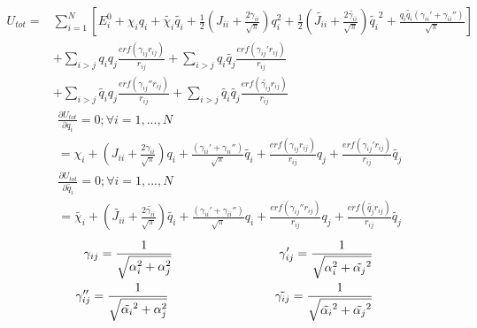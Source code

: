 \documentclass{letter}
\begin{document}
	\begin{equation}
	\begin{split}
		U_{tot}  = &\sum_{i=1}^{N} [E_i^0 + \chi_i q_i + \tilde{\chi_i}\tilde{q_i }+ \frac{1}{2}(J_{ii}+\frac{2\gamma_{ii}}{\sqrt{\pi}})q_i^2 + \frac{1}{2}(\tilde{J_{ii}}+\frac{2\tilde{\gamma_{ii}}}{\sqrt{\pi}})\tilde{q_i}^2+\frac{q_i\tilde{q_i }(\gamma_{ii}'+\gamma_{ii}'')}{\sqrt{\pi}}]\\ 
		&+\sum_{i>j} q_iq_j\frac{erf(\gamma_{ij}r_{ij})}{r_{ij}} + \sum_{i>j} q_i\tilde{q_j}\frac{erf(\gamma_{ij}'r_{ij})}{r_{ij}}\\
		 &+\sum_{i>j}\tilde{q_i }q_j \frac{erf(\gamma_{ij}''r_{ij})}{r_{ij}} + \sum_{i>j}\tilde{q_i}\tilde{q_j} \frac{erf(\tilde{\gamma_{ij}}r_{ij})}{r_{ij}}
	\end{split}
	\end{equation}
	\newline
	\begin{equation}
		\begin{split}
			&\frac{\partial U_{tot}}{\partial q_i}=0 ; \forall i = 1 ,...,N \\
			& = \chi_i 
			+ (J_{ii}+\frac{2\gamma_{ii}}{\sqrt{\pi}})q_i 
			+ \frac{(\gamma_{ii}'+ \gamma_{ii}'')}{\sqrt{\pi}}\tilde{q_i} 
			+ \frac{erf(\gamma_{ij}r_{ij})}{r_{ij}}q_j 
			+ \frac{erf(\gamma_{ij}'r_{ij})}{r_{ij}}\tilde{q_j}
		\end{split}
	\end{equation}
	\begin{equation}
		\begin{split}
			&\frac{\partial U_{tot}}{\partial \tilde{q_i}}=0 ; \forall i = 1 ,..., N  \\
			& = \tilde{\chi_i} 
			+ (\tilde{J_{ii}} + \frac{2\tilde{\gamma_{ii}}}{\sqrt{\pi}})\tilde{q_i } 
			+ \frac{(\gamma_{ii}' + \gamma_{ii}'')}{\sqrt{\pi}}q_i 
			+ \frac{erf(\gamma_{ij}''r_{ij})}{r_{ij}}q_j 
			+ \frac{erf(\tilde{q_j}r_{ij})}{r_{ij}}\tilde{q_j}
		\end{split}		
	\end{equation}
	\begin{equation}
	\begin{split}
			\gamma_{ij} = \frac{1}{\sqrt{\alpha_i^2+\alpha_j^2}}
			\hspace{0.25\textwidth} 
			\gamma_{ij}'=\frac{1}{\sqrt{\alpha_i^2+\tilde{\alpha_j}^2}}\\	
			\gamma_{ij}''=\frac{1}{\sqrt{\tilde{\alpha_i}^2+\alpha_j^2}}
			\hspace{0.25\textwidth} 
			\tilde{\gamma_{ij}} = \frac{1}{\sqrt{\tilde{\alpha_i}^2+\tilde{\alpha_j}^2}}
	\end{split}
	\end{equation}
\end{document}
